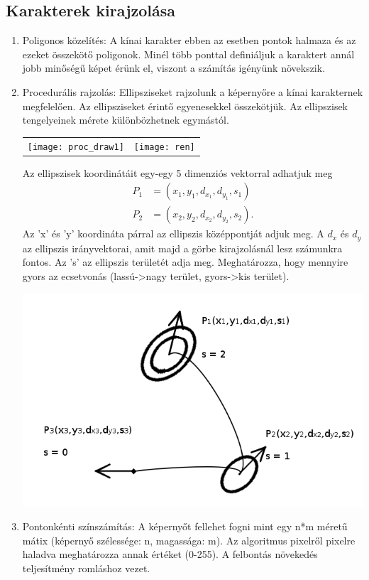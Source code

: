 \subsection{Karakterek kirajzolása}

\begin{enumerate}
\item Poligonos közelítés: A kínai karakter ebben az esetben pontok halmaza és az ezeket összekötő poligonok. Minél több ponttal definiáljuk a karaktert annál jobb minőségű képet érünk el, viszont a számítás igényünk növekszik.
\item Procedurális rajzolás: Ellipsziseket rajzolunk a képernyőre a kínai karakternek megfelelően. Az ellipsziseket érintő egyenesekkel összekötjük. Az ellipszisek tengelyeinek mérete különbözhetnek egymástól.
\begin{center}
\begin{tabular}{ c c }
\texttt{[image: proc\_draw1]} & \texttt{[image: ren]}
\end{tabular}
\end{center}
Az ellipszisek koordinátáit egy-egy 5 dimenziós vektorral adhatjuk meg
\begin{align*}
P_1 &= (x_1, y_1, d_{x_1}, d_{y_1}, s_1) \\
P_2 &= (x_2, y_2, d_{x_2}, d_{y_2}, s_2).
\end{align*}
Az 'x' és 'y' koordináta párral az ellipszis középpontját adjuk meg. A $d_x$ és $d_y$ az ellipszis irányvektorai, amit majd a görbe kirajzolásnál lesz számunkra fontos. Az 's' az ellipszis területét adja meg. Meghatározza, hogy mennyire gyors az ecsetvonás (lassú->nagy terület, gyors->kis terület).
\begin{center}
\includegraphics[scale=0.5]{images/proc_draw2}
\end{center}
\item Pontonkénti színszámítás: A képernyőt fellehet fogni mint egy n*m méretű mátix (képernyő szélessége: n, magassága: m). Az algoritmus pixelről pixelre haladva meghatározza annak értéket (0-255). A felbontás növekedés teljesítmény romláshoz vezet.
\end{enumerate}

